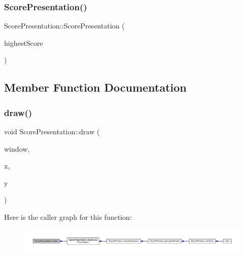 \subsubsection{\texorpdfstring{Score\+Presentation()}{ScorePresentation()}\hspace{0.1cm}{\footnotesize\ttfamily [2/2]}}
{\footnotesize\ttfamily Score\+Presentation\+::\+Score\+Presentation (\begin{DoxyParamCaption}\item[{int}]{highest\+Score }\end{DoxyParamCaption})}



\subsection{Member Function Documentation}
\mbox{\label{class_score_presentation_af0e8b8532f70ae4a1d4a0a7ca473ff0f}} 
\subsubsection{\texorpdfstring{draw()}{draw()}}
{\footnotesize\ttfamily void Score\+Presentation\+::draw (\begin{DoxyParamCaption}\item[{sf\+::\+Render\+Window \&}]{window,  }\item[{float}]{x,  }\item[{float}]{y }\end{DoxyParamCaption})}

Here is the caller graph for this function\+:\nopagebreak
\begin{figure}[H]
\begin{center}
\leavevmode
\includegraphics[width=350pt]{class_score_presentation_af0e8b8532f70ae4a1d4a0a7ca473ff0f_icgraph}
\end{center}
\end{figure}
\mbox{\label{class_score_presentation_adf2c954da3e73d5adbe0e8d30243ee25}} 
